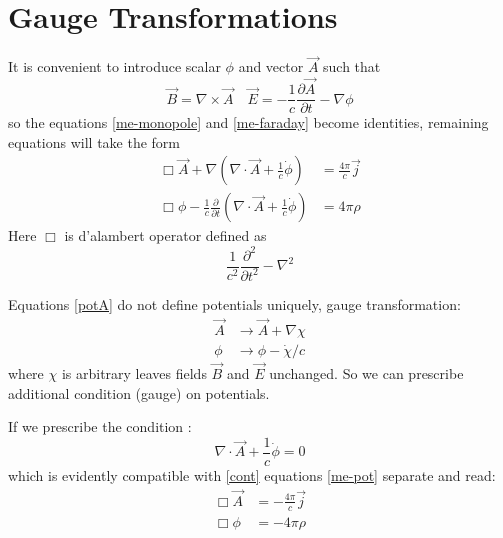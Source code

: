 \section{Gauge Transformations}
\label{gauge-transformations}

It is convenient to introduce scalar $\phi$ and vector $\vec A$ such that
\begin{equation}
   \label {potA}
   \vec B = \nabla \times \vec A \quad \vec E = -\frac{1}{c} \frac{\partial \vec A}{\partial t} - \nabla \phi
\end{equation}
so the equations \eqref{me-monopole} and \eqref{me-faraday} become identities, remaining equations will
take the form
\begin{equation}
   \label {me-pot}
   \begin{split}
       \Box \vec A + \nabla ( \nabla \cdot \vec A+ \frac{1}{c} \dot \phi) &= \frac{4 \pi}{c} \vec j \\
       \Box \phi -\frac{1}{c} \frac{\partial}{\partial t}( \nabla \cdot \vec A+ \frac{1}{c} \dot \phi) & = 4 \pi \rho
   \end{split}
\end{equation}
Here $ \Box $ is d'alambert operator defined as \[  \frac{1}{c^2} \frac{\partial^2}{\partial t^2}-\nabla^2 \]

Equations \eqref{potA} do not define potentials uniquely, gauge transformation: 
\begin{equation}
   \label {gauge-transformation}
   \begin{split}
       \vec A &\rightarrow \vec A+ \nabla \chi \\
       \phi & \rightarrow \phi - \dot \chi /c
   \end{split}
\end{equation}
 where $ \chi  $ is arbitrary leaves fields $ \vec B $
and $ \vec E $ unchanged. So we can prescribe additional
condition (gauge) on potentials.

If we prescribe the condition :
\begin{equation}
   \label {lg}
    \nabla \cdot \vec A+ \frac{1}{c} \dot \phi=0
\end{equation}
which is evidently compatible with \eqref{cont} equations \eqref{me-pot} separate and read:
\begin{equation}
   \label {me-pot-lg}
   \begin{split}
       \Box \vec A &= -\frac{4 \pi}{c} \vec j \\
       \Box \phi  & = -4 \pi \rho
   \end{split}
\end{equation}


